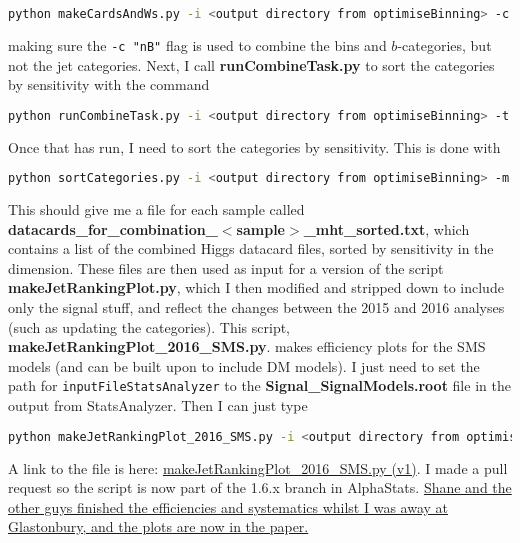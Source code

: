 \begin{lstlisting}[belowskip=-0.7cm, language=sh, numbers=none]
python makeCardsAndWs.py -i <output directory from optimiseBinning> -c "nB"
\end{lstlisting}

making sure the \verb!-c "nB"! flag is used to combine the \HT bins and $b$-categories, but not the jet categories. Next, I call \textbf{runCombineTask.py} to sort the categories by sensitivity with the command

\begin{lstlisting}[belowskip=-0.7cm, language=sh, numbers=none]
python runCombineTask.py -i <output directory from optimiseBinning> -t ASCLS_UL_PRIOR --what expected
\end{lstlisting}

Once that has run, I need to sort the \njet categories by sensitivity. This is done with

\begin{lstlisting}[belowskip=-0.7cm, language=sh, numbers=none]
python sortCategories.py -i <output directory from optimiseBinning> -m ul -c "nB"
\end{lstlisting}

This should give me a file for each sample called \textbf{datacards\_for\_combination\_$<$sample$>$\_mht\_sorted.txt}, which contains a list of the combined Higgs datacard files, sorted by sensitivity in the \njet dimension. These files are then used as input for a version of the script \textbf{makeJetRankingPlot.py}, which I then modified and stripped down to include only the signal stuff, and reflect the changes between the 2015 and 2016 analyses (such as updating the \njet categories). This script, \textbf{makeJetRankingPlot\_2016\_SMS.py}. makes efficiency plots for the SMS models (and can be built upon to include DM models). I just need to set the path for \verb!inputFileStatsAnalyzer! to the \textbf{Signal\_SignalModels.root} file in the output from StatsAnalyzer. Then I can just type

\begin{lstlisting}[belowskip=-0.7cm, language=sh, numbers=none]
python makeJetRankingPlot_2016_SMS.py -i <output directory from optimiseBinning> -o <output directory for efficiency plots>
\end{lstlisting}

A link to the file is here: \href{run:sec23/makeJetRankingPlot_2016_SMSv1.py}{makeJetRankingPlot\_2016\_SMS.py (v1)}. I made a pull request so the script is now part of the 1.6.x branch in AlphaStats. \uline{Shane and the other guys finished the efficiencies and systematics whilst I was away at Glastonbury, and the plots are now in the paper.}


